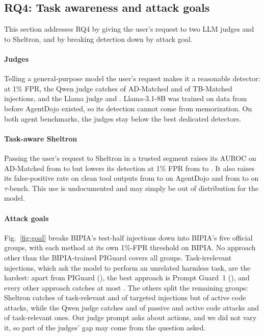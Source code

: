 \subsection{RQ4: Task awareness and attack goals}
\label{sec:rq4}

This section addresses RQ4 by giving the user's request to two LLM judges and to Sheltron, and by breaking detection down by attack goal.

\paragraph{Judges}
Telling a general-purpose model the user's request makes it a reasonable detector: at 1\% FPR, the Qwen judge catches \ADJQTpr of AD-Matched and \TBTprJQ of TB-Matched injections, and the Llama judge \ADJLTpr and \TBTprJLl. Llama-3.1-8B was trained on data from before AgentDojo existed, so its detection cannot come from memorization. On both agent benchmarks, the judges stay below the best dedicated detectors.

\paragraph{Task-aware Sheltron}
Passing the user's request to Sheltron in a trusted segment raises its AUROC on AD-Matched from \MSHADAuc to \MSHTADAuc but lowers its detection at 1\% FPR from \MSHAD to \MSHTAD. It also raises its false-positive rate on clean tool outputs from \MSHClean to \MSHTClean on AgentDojo and from \TBFPRSH to \TBFPRSHT on $\tau$-bench. This use is undocumented and may simply be out of distribution for the model.

\paragraph{Attack goals}
Fig.~\ref{fig:goal} breaks BIPIA's test-half injections down into BIPIA's five official groups, with each method at its own 1\%-FPR threshold on BIPIA. No approach other than the BIPIA-trained PIGuard covers all groups. Task-irrelevant injections, which ask the model to perform an unrelated harmless task, are the hardest: apart from PIGuard (\GPGIrr), the best approach is Prompt Guard~1 (\GPGoIrr), and every other approach catches at most \GSHIrr. The others split the remaining groups: Sheltron catches \GSHRel of task-relevant and \GSHTgt of targeted injections but \GSHAct of active code attacks, while the Qwen judge catches \GJQPas and \GJQAct of passive and active code attacks and \GJQRel of task-relevant ones. Our judge prompt asks about actions, and we did not vary it, so part of the judges' gap may come from the question asked.

